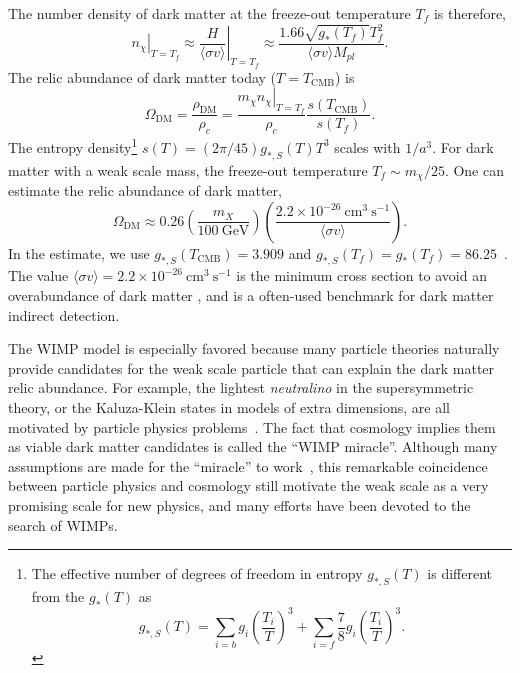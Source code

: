 \documentclass[doublespace,nopageskip]{VTthesis} %
\begin{document}
The number density of dark matter at the freeze-out temperature $T_f$ is therefore,
\begin{equation}
    \left.n_\chi\right|_{T = T_f} \approx \left.\frac{H}{\langle\sigma v\rangle}\right|_{T = T_f} \approx \frac{1.66\sqrt{g_*(T_f)}T_f^2}{\langle\sigma v\rangle M_{pl}}.
\end{equation}
The relic abundance of dark matter today ($T=T_\mathrm{CMB}$) is
\begin{equation}
    \Omega_\mathrm{DM} = \frac{\rho_\mathrm{DM}}{\rho_c} = \frac{\left. m_\chi n_\chi\right|_{T = T_f}}{\rho_c}\frac{s(T_\mathrm{CMB})}{s(T_f)}.
\end{equation}
The entropy density\footnote{The effective number of degrees of freedom in entropy $g_{*,S}(T)$ is different from the $g_{*}(T)$ as
\begin{equation*}
    g_{*,S}(T) = \sum_{i=b}g_i\left(\frac{T_i}{T}\right)^3 + \sum_{i=f}\frac{7}{8}g_i\left(\frac{T_i}{T}\right)^3.
\end{equation*}
} $s(T) = (2\pi/45)g_{*,S}(T)T^3$ scales with $1/a^3$. For dark matter with a weak scale mass, the freeze-out temperature $T_f \sim m_\chi/25$. One can estimate the relic abundance of dark matter,
\begin{equation}
    \Omega_\mathrm{DM} \approx 0.26 \left( \frac{m_X}{100\ \mathrm{GeV}} \right) \left( \frac{2.2\times 10^{-26}\ \mathrm{cm}^3\ \mathrm{s}^{-1}}{\langle\sigma v\rangle} \right).
\end{equation}
In the estimate, we use $g_{*,S}(T_\mathrm{CMB}) = 3.909$ and $g_{*,S}(T_f) = g_{*}(T_f) = 86.25$~\cite{2016Galax...4...78H}. The value $\langle\sigma v\rangle = 2.2\times 10^{-26}\ \mathrm{cm}^3\ \mathrm{s}^{-1}$ is the minimum cross section to avoid an overabundance of dark matter , and is a often-used benchmark for dark matter indirect detection.

The WIMP model is especially favored because many particle theories naturally provide candidates for the weak scale particle that can explain the dark matter relic abundance. For example, the lightest \textit{neutralino} in the supersymmetric theory, or the Kaluza-Klein states in models of extra dimensions, are all motivated by particle physics problems~\cite{2005PhR...405..279B}. The fact that cosmology implies them as viable dark matter candidates is called the ``WIMP miracle''. Although many assumptions are made for the ``miracle'' to work~\cite{2019arXiv190407915L}, this remarkable coincidence between particle physics and cosmology still motivate the weak scale as a very promising scale for new physics, and many efforts have been devoted to the search of WIMPs.
\end{document}
